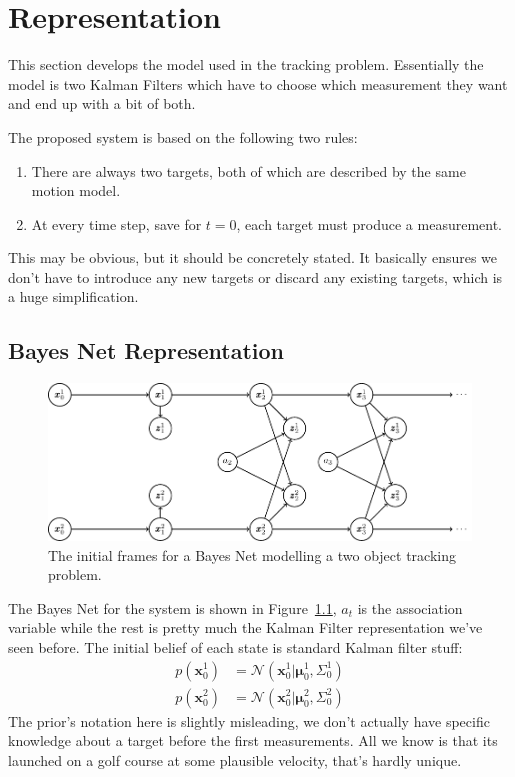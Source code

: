 \chapter{Representation}
\label{chapter:representation}
This section develops the model used in the tracking problem. Essentially the model is two Kalman Filters which have to choose which measurement they want and end up with a bit of both.

The proposed system is based on the following two rules:
\begin{enumerate}
\item There are always two targets, both of which are described by the same motion model.
\item At every time step, save for $t=0$, each target must produce a measurement.
\end{enumerate}
This may be obvious, but it should be concretely stated. It basically ensures we don't have to introduce any new targets or discard any existing targets, which is a huge simplification.

\section{Bayes Net Representation}
\label{section:bayes_net}
\begin{figure}[!ht]
	\centering
	\includegraphics[scale=0.75]{tikz/bayes_net}
	\caption[A Bayes Net for a two object tracking problem.]{The initial frames for a Bayes Net modelling a two object tracking problem.}
	\label{figure:bayes_net}
\end{figure}
The Bayes Net for the system is shown in Figure~\ref{figure:bayes_net}, $a_{t}$ is the association variable while the rest is pretty much the Kalman Filter representation we've seen before. The initial belief of each state is standard Kalman filter stuff:
\begin{align}
p\left(\pmb{x}_{0}^{1}\right) &= \mathcal{N}\left( \pmb{x}_{0}^{1} | \pmb{\mu}_{0}^{1}, \Sigma_{0}^{1} \right) \\
p\left(\pmb{x}_{0}^{2}\right) &= \mathcal{N}\left( \pmb{x}_{0}^{2} | \pmb{\mu}_{0}^{2}, \Sigma_{0}^{2} \right) 
\end{align}
The prior's notation here is slightly misleading, we don't actually have specific knowledge about a target before the first measurements. All we know is that its launched on a golf course at some plausible velocity, that's hardly unique. 

